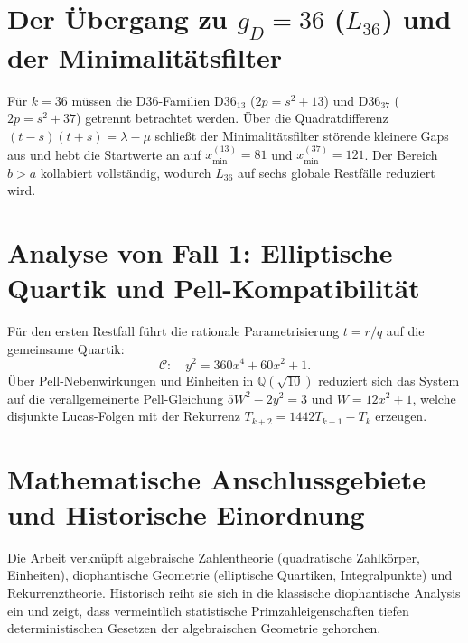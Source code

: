 \documentclass[11pt,a4paper]{article}
\begin{document}
\section{Der Übergang zu $g_D = 36$ ($L_{36}$) und der Minimalitätsfilter}
Für $k = 36$ müssen die D36-Familien $\mathrm{D36}_{13}$ ($2p = s^2 + 13$) und $\mathrm{D36}_{37}$ ($2p = s^2 + 37$) getrennt betrachtet werden. Über die Quadratdifferenz $(t-s)(t+s) = \lambda - \mu$ schließt der Minimalitätsfilter störende kleinere Gaps aus und hebt die Startwerte an auf $x_{\min}^{(13)} = 81$ und $x_{\min}^{(37)} = 121$. Der Bereich $b > a$ kollabiert vollständig, wodurch $L_{36}$ auf sechs globale Restfälle reduziert wird.

\section{Analyse von Fall 1: Elliptische Quartik und Pell-Kompatibilität}
Für den ersten Restfall führt die rationale Parametrisierung $t = r/q$ auf die gemeinsame Quartik:
\begin{equation}
\mathcal{C}:\quad y^2 = 360x^4 + 60x^2 + 1.
\end{equation}
Über Pell-Nebenwirkungen und Einheiten in $\mathbb{Q}(\sqrt{10})$ reduziert sich das System auf die verallgemeinerte Pell-Gleichung $5W^2 - 2y^2 = 3$ und $W = 12x^2 + 1$, welche disjunkte Lucas-Folgen mit der Rekurrenz $T_{k+2} = 1442T_{k+1} - T_k$ erzeugen.

\section{Mathematische Anschlussgebiete und Historische Einordnung}
Die Arbeit verknüpft algebraische Zahlentheorie (quadratische Zahlkörper, Einheiten), diophantische Geometrie (elliptische Quartiken, Integralpunkte) und Rekurrenztheorie. Historisch reiht sie sich in die klassische diophantische Analysis ein und zeigt, dass vermeintlich statistische Primzahleigenschaften tiefen deterministischen Gesetzen der algebraischen Geometrie gehorchen.
\end{document}
